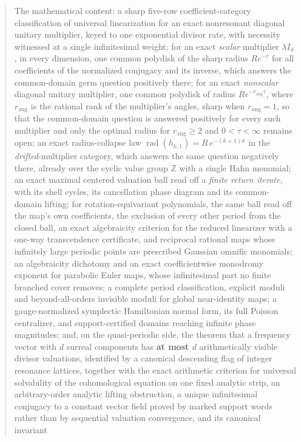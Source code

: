 \documentclass[11pt,letterpaper]{article}
\theoremstyle{definition}
\theoremstyle{remark}
\newcommand{\Z}{\mathbb Z}
\newcommand{\rad}{\operatorname{rad}}
\newcommand{\rang}{r_{\mathrm{ang}}}
\numberwithin{equation}{section}
\begin{document}
\begin{titlepage}
\begin{minipage}{0.92\textwidth}
\begin{abstract}
The mathematical content: a sharp five-row coefficient-category
classification of universal linearization for an exact nonresonant diagonal
unitary multiplier, keyed to one exponential divisor rate, with necessity
witnessed at a single infinitesimal weight; for an exact \emph{scalar}
multiplier $\lambda I_d$, in every dimension, one common polydisk of the
sharp radius $Re^{-\tau}$ for all coefficients of the normalized conjugacy
and its inverse, which answers the common-domain germ question positively
there; for an exact \emph{nonscalar} diagonal unitary multiplier, one common
polydisk of radius $Re^{-\rang\tau}$, where $\rang$ is the rational rank of
the multiplier's angles, sharp when $\rang=1$, so that the common-domain
question is answered positively for every such multiplier and only the
optimal radius for $\rang\ge2$ and $0<\tau<\infty$ remains open; an exact radius-collapse law
$\rad(h_{k,1})=R\,e^{-(k+1)\sigma}$ in the \emph{drifted}-multiplier
category, which answers the same question negatively there, already over the
cyclic value group $\Z$ with a single Hahn monomial; an exact maximal
centered valuation ball read
off a \emph{finite return iterate}, with its shell cycles, its
cancellation phase diagram and its common-domain lifting; for
rotation-equivariant polynomials, the same ball read off the map's own
coefficients, the exclusion of every other period from the closed ball, an
exact algebraicity criterion for the reduced linearizer with a one-way
transcendence certificate, and reciprocal rational maps whose infinitely
large periodic points are prescribed Gaussian omnific monomials; an algebraicity
dichotomy and an exact coefficientwise monodromy exponent for parabolic
Euler maps, whose infinitesimal part no finite branched cover removes; a
complete period classification, explicit moduli and beyond-all-orders
invisible moduli for global near-identity maps; a gauge-normalized
symplectic Hamiltonian normal form, its full Poisson centralizer, and
support-certified domains reaching infinite phase magnitudes; and, on the
quasi-periodic side, the theorem that a frequency vector with $d$ surreal
components has \textbf{at most $d$} arithmetically visible divisor
valuations, identified by a canonical descending flag of integer resonance
lattices, together with the exact arithmetic criterion for universal
solvability of the cohomological equation on one fixed analytic strip, an
arbitrary-order analytic lifting obstruction, a unique infinitesimal
conjugacy to a constant vector field proved by marked support words rather
than by sequential valuation convergence, and its canonical invariant

\end{abstract}
\end{minipage}
\end{titlepage}
\end{document}
